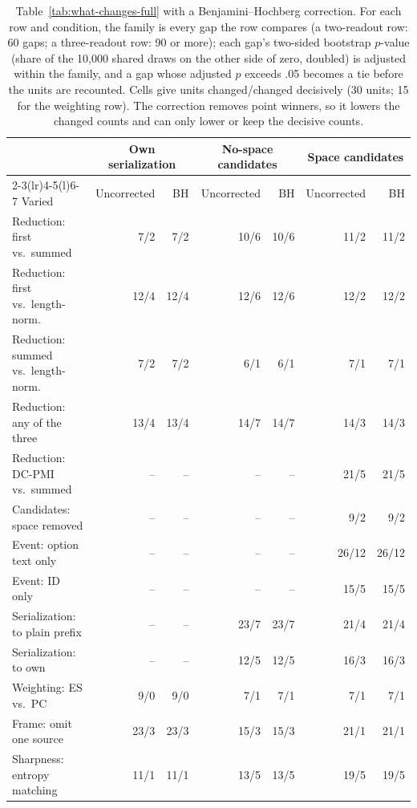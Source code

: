 \begin{table}[t]
\centering\scriptsize
\setlength{\tabcolsep}{3pt}
\begin{tabular}{@{}lrrrrrr@{}}
\toprule
& \multicolumn{2}{c}{Own serialization} & \multicolumn{2}{c}{No-space candidates} & \multicolumn{2}{c}{Space candidates} \\
\cmidrule(lr){2-3}\cmidrule(lr){4-5}\cmidrule(l){6-7}
Varied & Uncorrected & BH & Uncorrected & BH & Uncorrected & BH \\
\midrule
Reduction: first vs.\ summed & 7/2 & 7/2 & 10/6 & 10/6 & 11/2 & 11/2 \\
Reduction: first vs.\ length-norm. & 12/4 & 12/4 & 12/6 & 12/6 & 12/2 & 12/2 \\
Reduction: summed vs.\ length-norm. & 7/2 & 7/2 & 6/1 & 6/1 & 7/1 & 7/1 \\
Reduction: any of the three & 13/4 & 13/4 & 14/7 & 14/7 & 14/3 & 14/3 \\
Reduction: DC-PMI vs.\ summed & -- & -- & -- & -- & 21/5 & 21/5 \\
Candidates: space removed & -- & -- & -- & -- & 9/2 & 9/2 \\
Event: option text only & -- & -- & -- & -- & 26/12 & 26/12 \\
Event: ID only & -- & -- & -- & -- & 15/5 & 15/5 \\
Serialization: to plain prefix & -- & -- & 23/7 & 23/7 & 21/4 & 21/4 \\
Serialization: to own & -- & -- & 12/5 & 12/5 & 16/3 & 16/3 \\
Weighting: ES vs.\ PC & 9/0 & 9/0 & 7/1 & 7/1 & 7/1 & 7/1 \\
Frame: omit one source & 23/3 & 23/3 & 15/3 & 15/3 & 21/1 & 21/1 \\
Sharpness: entropy matching & 11/1 & 11/1 & 13/5 & 13/5 & 19/5 & 19/5 \\
\bottomrule
\end{tabular}
\caption{Table~\ref{tab:what-changes-full} with a Benjamini--Hochberg correction. For each row and condition, the family is every gap the row compares (a two-readout row: 60 gaps; a three-readout row: 90 or more); each gap's two-sided bootstrap $p$-value (share of the 10,000 shared draws on the other side of zero, doubled) is adjusted within the family, and a gap whose adjusted $p$ exceeds .05 becomes a tie before the units are recounted. Cells give units changed/changed decisively (30 units; 15 for the weighting row). The correction removes point winners, so it lowers the changed counts and can only lower or keep the decisive counts.}
\label{tab:bh}
\end{table}
